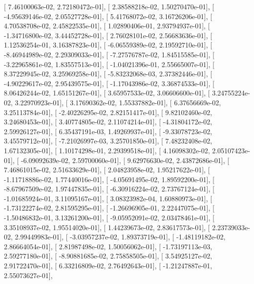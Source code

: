 \documentclass{article}
\begin{document}
       [  7.46100063e-02,   2.72180472e-01],
       [  2.38588218e-02,   1.50270470e-01],
       [ -4.95639146e-02,   2.05527728e-01],
       [  5.41768072e-02,   3.16726206e-01],
       [  4.70538708e-02,   2.45822535e-01],
       [  1.02890406e-01,   2.93794937e-01],
       [ -1.34716800e-02,   3.44452728e-01],
       [  2.76028101e-02,   2.56683636e-01],
       [  1.12536254e-01,   3.16387823e-01],
       [ -6.06559389e-02,   2.19592710e-01],
       [ -8.46944989e-02,   2.29309033e-01],
       [ -7.27576787e-02,   1.84515585e-01],
       [ -3.22965861e-02,   1.83557513e-01],
       [ -1.04021396e-01,   2.55665007e-01],
       [  8.37229945e-02,   3.25969258e-01],
       [ -5.83232068e-03,   2.37382446e-01],
       [ -4.90229617e-02,   2.95439575e-01],
       [ -1.17043986e-02,   3.36874533e-01],
       [  8.06426244e-02,   1.65151267e-01],
       [  3.65957533e-02,   3.06606600e-01],
       [  3.24755224e-02,   3.22970923e-01],
       [  3.17690362e-02,   1.55337882e-01],
       [  6.37656669e-02,   3.25113784e-01],
       [ -2.40226295e-02,   2.82151417e-01],
       [  9.82102460e-02,   3.24680453e-01],
       [  3.40774805e-02,   2.11074214e-01],
       [ -4.31804172e-02,   2.59926127e-01],
       [  6.35437191e-03,   1.49269937e-01],
       [ -9.33078723e-02,   3.45579712e-01],
       [ -7.21026997e-03,   3.25701850e-01],
       [  7.48232408e-02,   1.67132305e-01],
       [  1.10174298e-01,   2.29399518e-01],
       [  4.16098302e-02,   2.05107423e-01],
       [ -6.09092639e-02,   2.59700060e-01],
       [  9.62976630e-02,   2.43872686e-01],
       [  7.46861015e-02,   2.51633629e-01],
       [  2.04823958e-02,   1.95217622e-01],
       [ -1.11718886e-02,   1.77440016e-01],
       [ -4.05691495e-02,   1.89592200e-01],
       [ -8.67967509e-02,   1.97447835e-01],
       [ -6.30916224e-02,   2.73767124e-01],
       [ -1.01685924e-01,   3.11095167e-01],
       [  3.08323982e-04,   1.60880973e-01],
       [ -1.73122274e-02,   2.81595295e-01],
       [ -1.26696905e-01,   2.22447075e-01],
       [ -1.50486832e-01,   3.13261200e-01],
       [ -9.05952091e-02,   2.03478461e-01],
       [  3.35108937e-02,   1.95514020e-01],
       [  1.44239673e-02,   2.83617573e-01],
       [  2.23739033e-02,   2.99449983e-01],
       [ -3.03957237e-02,   1.89373719e-01],
       [ -1.48119182e-02,   2.86664054e-01],
       [  2.81987498e-02,   1.50056062e-01],
       [ -1.73197113e-03,   2.59277180e-01],
       [ -8.90881685e-02,   2.75858505e-01],
       [  3.54925127e-02,   2.91722470e-01],
       [  6.33216809e-02,   2.76492643e-01],
       [ -1.21247887e-01,   2.55073627e-01],
\end{document}

